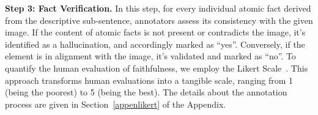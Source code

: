 \vspace{.5em}
\noindent \textbf{Step 3: Fact Verification.}
In this step, for every individual atomic fact derived from the descriptive sub-sentence, annotators assess its consistency with the given image. If the content of atomic facts is not present or contradicts the image, it's identified as a hallucination, and accordingly marked as ``yes''. Conversely, if the element is in alignment with the image, it's validated and marked as ``no''. 
To quantify the human evaluation of faithfulness, we employ the Likert Scale~\cite{likert1932technique}. This approach transforms human evaluations into a tangible scale, ranging from 1 (being the poorest) to 5 (being the best). The details about the annotation process are given in Section~\ref{appenlikert} of the Appendix.










